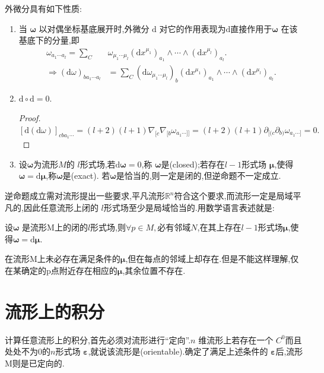 外微分具有如下性质:
\begin{enumerate}
\item 当 $\boldsymbol{\omega}$ 以对偶坐标基底展开时,外微分 $\mathrm{d}$ 对它的作用表现为$\mathrm{d}$直接作用于$\boldsymbol{\omega}$ 在该基底下的分量,即
$$
\begin{aligned}
\omega_{a_1\cdots a_l}=\sum\limits_C&\omega_{\mu_1\cdots\mu_l}(\text{d}x^{\mu_1})_{a_1}\wedge\cdots\wedge(\text{d}x^{\mu_l})_{a_l}.\\
\Rightarrow (\text{d}\omega)_{ba_1\cdots a_l}&=\sum\limits_C(\text{d}\omega_{\mu_1\cdots\mu_l})_b(\text{d}x^{\mu_1})_{a_1}\wedge\cdots\wedge(\text{d}x^{\mu_l})_{a_l}.
\end{aligned}
$$
\item $\mathrm{d}\circ \mathrm{d}=0$.

\begin{proof}
    $[\mathrm{d}(\mathrm{d}\omega)]_{cba_1\cdots}=(l+2)(l+1)\nabla_{[c}\nabla_{[b}\omega_{a_1\cdots]]}=(l+2)(l+1)\partial_{[(c}\partial_{b)}\omega_{a_1\cdots]}=0.
$
\end{proof}
\item 设$\boldsymbol{\omega}$为流形$M$的 $l$形式场,若$\mathrm{d}\boldsymbol{\omega}=0$,称 $\boldsymbol{\omega}$是(closed);若存在$l-1$形式场 $\boldsymbol{\mu}$,使得$\boldsymbol{\omega}=\mathrm{d}\boldsymbol{\mu}$,称$\boldsymbol{\omega}$是(exact).
若$\boldsymbol{\omega}$是恰当的,则一定是闭的,但逆命题不一定成立.
\end{enumerate}
\begin{remark}
逆命题成立需对流形提出一些要求,平凡流形$\mathbb{R}^n$符合这个要求,而流形一定是局域平凡的,因此任意流形上闭的 $l$形式场至少是局域恰当的.用数学语言表述就是:

设$\boldsymbol{\omega}$ 是流形M上的闭的$l$形式场,则$\forall p\in M,$必有邻域$N$,在其上存在$l-1$形式场$\boldsymbol{\mu}$,使得$\boldsymbol{\omega}=\mathrm{d}\boldsymbol{\mu}$. 

在流形M上未必存在满足条件的$\boldsymbol{\mu}$,但在每点的邻域上却存在.但是不能这样理解,仅在某确定的p点附近存在相应的$\boldsymbol{\mu}$,其余位置不存在. 
\end{remark}

\section{流形上的积分}

计算任意流形上的积分,首先必须对流形进行“定向”.$n$ 维流形上若存在一个 $C^0$而且处处不为0的$n$形式场 $\boldsymbol{\varepsilon}$,就说该流形是(orientable).确定了满足上述条件的 $\boldsymbol{\varepsilon}$后,流形M则是已定向的.

